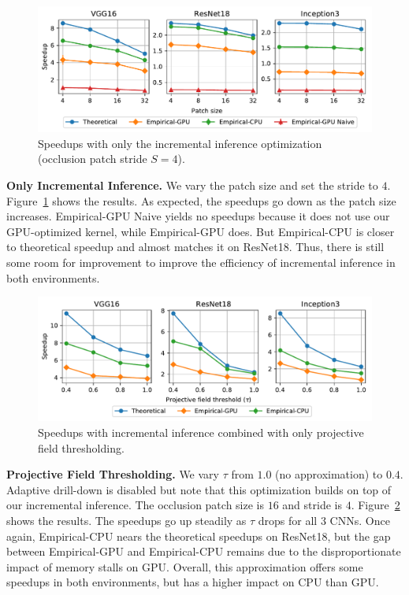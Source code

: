 \begin{figure}[t]
\includegraphics[width=\columnwidth]{images/5_2_1_edited}
\vspace{-8mm}
\caption{Speedups with only the incremental inference optimization (occlusion patch stride $S=4$).}
\vspace{-2mm}
\label{fig:5_2_1_edited}
\end{figure}

\vspace{2mm}
\noindent \textbf{Only Incremental Inference.} 
We vary the patch size and set the stride to $4$. Figure~\ref{fig:5_2_1_edited} shows the results. As expected, the speedups go down as the patch size increases. Empirical-GPU Naive yields no speedups because it does not use our GPU-optimized kernel, while Empirical-GPU does. But Empirical-CPU is closer to theoretical speedup and almost matches it on ResNet18. Thus, there is still some room for improvement to improve the efficiency of incremental inference in both environments.


\begin{figure}[t]
\includegraphics[width=\columnwidth]{images/5_2_2_edited}
\vspace{-8mm}
\caption{Speedups with incremental inference combined with only projective field thresholding.}
\vspace{-2mm}
\label{fig:5_2_2_edited}
\end{figure}

\vspace{2mm}
\noindent \textbf{Projective Field Thresholding.} We vary $\tau$ from $1.0$ (no approximation) to $0.4$. Adaptive drill-down is disabled but note that this optimization builds on top of our incremental inference. The occlusion patch size is $16$ and stride is $4$. Figure~\ref{fig:5_2_2_edited} shows the results. The speedups go up steadily as $\tau$ drops for all 3 CNNs. Once again, Empirical-CPU nears the theoretical speedups on ResNet18, but the gap between Empirical-GPU and Empirical-CPU remains due to the disproportionate impact of memory stalls on GPU. Overall, this approximation offers some speedups in both environments, but has a higher impact on CPU than GPU.

